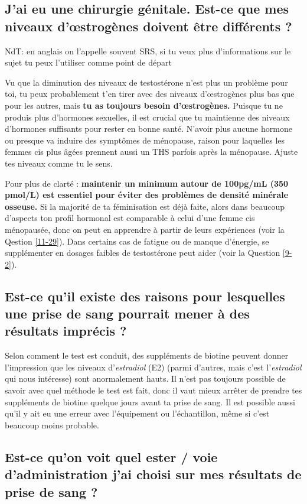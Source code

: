 \documentclass{article}
\begin{document}
\subsection{J'ai eu une chirurgie génitale. Est-ce que mes niveaux d'œstrogènes doivent être différents ?}

NdT: en anglais on l'appelle souvent SRS, si tu veux plus d'informations sur le sujet tu peux l'utiliser comme point de départ

Vu que la diminution des niveaux de testostérone n'est plus un problème pour toi, tu peux probablement t'en tirer avec des niveaux d'œstrogènes plus bas que pour les autres, mais \textbf{tu as toujours besoin d'œstrogènes.} Puisque tu ne produis plus d'hormones sexuelles, il est crucial que tu maintienne des niveaux d'hormones suffisants pour rester en bonne santé. N'avoir plus aucune hormone ou presque va induire des symptômes de ménopause, raison pour laquelles les femmes cis plus âgées prennent aussi un THS parfois après la ménopause. Ajuste tes niveaux comme tu le sens.

Pour plus de clarté : \textbf{maintenir un minimum autour de 100pg/mL (350 pmol/L) est essentiel pour éviter des problèmes de densité minérale osseuse.} Si la majorité de ta féminisation est déjà faite, alors dans beaucoup d'aspects ton profil hormonal est comparable à celui d'une femme cis ménopausée, donc on peut en apprendre à partir de leurs expériences (voir la Qestion \ref{11-29}). Dans certains cas de fatigue ou de manque d'énergie, se supplémenter en dosages faibles de testostérone peut aider (voir la Question \ref{9-2}).

\subsection{Est-ce qu'il existe des raisons pour lesquelles une prise de sang pourrait mener à des résultats imprécis ?}

Selon comment le test est conduit, des suppléments de biotine peuvent donner l'impression que les niveaux d'\textit{estradiol} (E2) (parmi d'autres, mais c'est l'\textit{estradiol} qui nous intéresse) sont anormalement hauts. Il n'est pas toujours possible de savoir avec quel méthode le test est fait, donc il vaut mieux arrêter de prendre tes suppléments de biotine quelque jours avant ta prise de sang. Il est possible aussi qu'il y ait eu une erreur avec l'équipement ou l'échantillon, même si c'est beaucoup moins probable.

\subsection{Est-ce qu'on voit quel ester / voie d'administration j'ai choisi sur mes résultats de prise de sang ?}\label{4-16}
\end{document}
